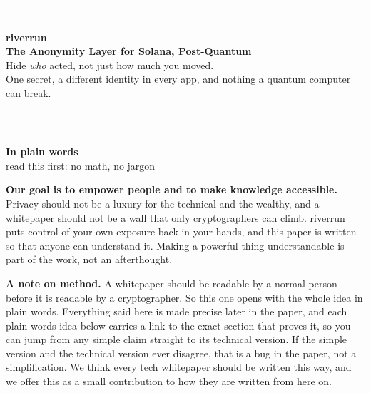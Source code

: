 \documentclass[11pt]{article}
\begin{document}
\thispagestyle{empty}
\begin{center}
{\color{river}\rule{\textwidth}{1.2pt}}\\[1.5em]
{\Huge\bfseries riverrun}\\[0.6em]
{\LARGE\bfseries The Anonymity Layer for Solana, Post-Quantum}\\[0.8em]
{\large Hide \emph{who} acted, not just how much you moved.\\[0.2em] One secret, a different identity in every app, and nothing a quantum computer can break.}\\[1.3em]
{\color{river}\rule{\textwidth}{0.6pt}}\\[1.0em]
\end{center}

\begin{center}
{\Large\bfseries\color{river}In plain words}\\[0.2em]
{\footnotesize\color{steel}read this first: no math, no jargon}
\end{center}
\vspace{0.6em}

\begin{center}
\begin{minipage}{0.9\textwidth}
\centering\color{ink}
{\large\bfseries Our goal is to empower people and to make knowledge accessible.}\\[0.35em]
{\normalsize Privacy should not be a luxury for the technical and the wealthy, and a
whitepaper should not be a wall that only cryptographers can climb. riverrun puts control
of your own exposure back in your hands, and this paper is written so that anyone can
understand it. Making a powerful thing understandable is part of the work, not an
afterthought.}
\end{minipage}
\end{center}
\vspace{0.7em}

\begin{intuition}
\textbf{A note on method.} A whitepaper should be readable by a normal person before it
is readable by a cryptographer. So this one opens with the whole idea in plain words.
Everything said here is made precise later in the paper, and each plain-words idea below
carries a link to the exact section that proves it, so you can jump from any simple claim
straight to its technical version. If the simple version and the technical version ever
disagree, that is a bug in the paper, not a simplification. We think every tech
whitepaper should be written this way, and we offer this as a small contribution to how
they are written from here on.
\end{intuition}
\end{document}

